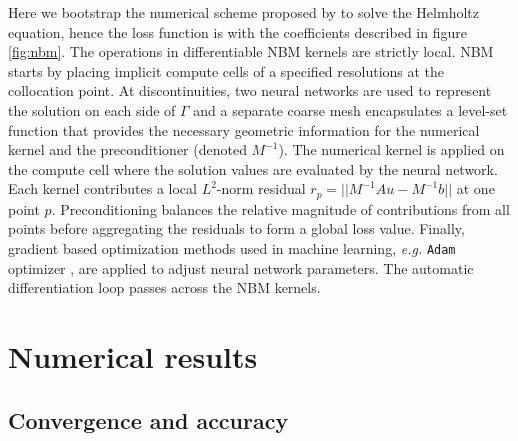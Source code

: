 \documentclass{article}
\begin{document}
Here we bootstrap the numerical scheme proposed by \cite{BOCHKOV2020109269} to solve the Helmholtz equation, hence the loss function is 
with the coefficients described in figure \ref{fig:nbm}. The operations in differentiable NBM kernels are strictly local. NBM starts by placing implicit compute cells of a specified resolutions at the collocation point. At discontinuities, two neural networks are used to represent the solution on each side of $\Gamma$ and a separate coarse mesh encapsulates a level-set function \citep{osher1988fronts} that provides the necessary geometric information for the numerical kernel and the preconditioner (denoted $M^{-1}$). The numerical kernel is applied on the compute cell where the solution values are evaluated by the neural network. Each kernel contributes a local $L^2$-norm residual $r_p = ||M^{-1}A u - M^{-1}b||$ at one point $p$. Preconditioning balances the relative magnitude of contributions from all points before aggregating the residuals to form a global loss value. Finally, gradient based optimization methods used in machine learning, \textit{e.g.} \texttt{Adam} optimizer \cite{kingma2014adam}, are applied to adjust neural network parameters. The automatic differentiation loop passes across the NBM kernels.








\section{Numerical results}
\subsection{Convergence and accuracy}
\end{document}
